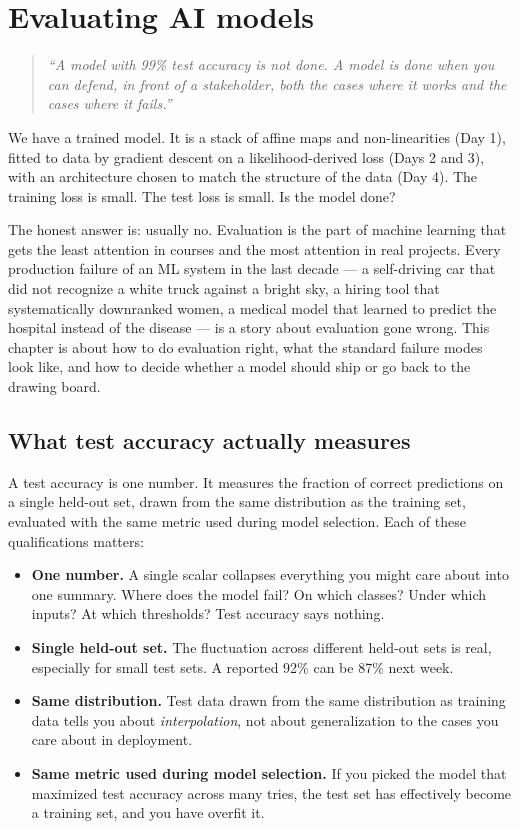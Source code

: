 \chapter{Evaluating AI models}
\label{ch:day5}

\begin{quote}
\emph{``A model with 99\% test accuracy is not done. A model is done when you can defend, in front of a stakeholder, both the cases where it works and the cases where it fails.''}
\end{quote}

We have a trained model. It is a stack of affine maps and non-linearities (Day 1), fitted to data by gradient descent on a likelihood-derived loss (Days 2 and 3), with an architecture chosen to match the structure of the data (Day 4). The training loss is small. The test loss is small. Is the model done?

The honest answer is: usually no. Evaluation is the part of machine learning that gets the least attention in courses and the most attention in real projects. Every production failure of an ML system in the last decade --- a self-driving car that did not recognize a white truck against a bright sky, a hiring tool that systematically downranked women, a medical model that learned to predict the hospital instead of the disease --- is a story about evaluation gone wrong. This chapter is about how to do evaluation right, what the standard failure modes look like, and how to decide whether a model should ship or go back to the drawing board.

\section{What test accuracy actually measures}

A test accuracy is one number. It measures the fraction of correct predictions on a single held-out set, drawn from the same distribution as the training set, evaluated with the same metric used during model selection. Each of these qualifications matters:

\begin{itemize}
  \item \textbf{One number.} A single scalar collapses everything you might care about into one summary. Where does the model fail? On which classes? Under which inputs? At which thresholds? Test accuracy says nothing.
  \item \textbf{Single held-out set.} The fluctuation across different held-out sets is real, especially for small test sets. A reported 92\% can be 87\% next week.
  \item \textbf{Same distribution.} Test data drawn from the same distribution as training data tells you about \emph{interpolation}, not about generalization to the cases you care about in deployment.
  \item \textbf{Same metric used during model selection.} If you picked the model that maximized test accuracy across many tries, the test set has effectively become a training set, and you have overfit it.
\end{itemize}

